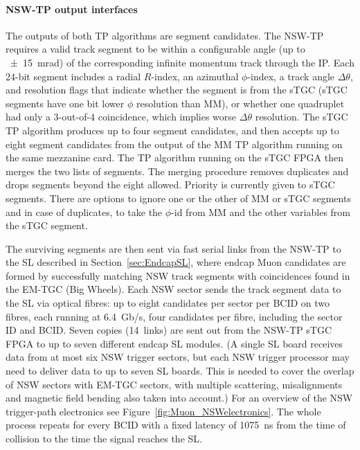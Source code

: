 \documentclass[cernpreprint, atlasdraft=false, UKenglish,british,orcidlogo, texmf, orcidlogo]{atlasdoc}
\begin{document}
\paragraph{NSW-TP output interfaces}
The outputs of both \gls{TP} algorithms are segment candidates.
The \gls{NSW-TP} requires a valid track segment to be within a configurable angle (up to \SI{\pm 15}{\milli\radian}) of the corresponding infinite momentum track through the \gls{IP}.
Each 24-bit segment includes a radial $R$-index, an azimuthal $\phi$-index, a track angle $\Delta\theta$, and resolution flags that indicate whether the segment is from the \gls{sTGC} (\gls{sTGC} segments have one bit lower $\phi$ resolution than \gls{MM}), or whether one quadruplet had only a 3-out-of-4 coincidence, which implies worse $\Delta\theta$ resolution.
The \gls{sTGC} \gls{TP} algorithm produces up to four segment candidates, and then accepts up to eight segment candidates from the output of the \gls{MM} \gls{TP} algorithm running on the same mezzanine card.
The \gls{TP} algorithm running on the \gls{sTGC} \gls{FPGA} then merges the two lists of segments.
The merging procedure removes duplicates and drops segments beyond the eight allowed.
Priority is currently given to \gls{sTGC} segments. There are options to ignore one or the other of \gls{MM} or \gls{sTGC} segments and in case of duplicates, to take the $\phi$-id from \gls{MM} and the other variables from the \gls{sTGC} segment.~\cite{NSWelx}
 
The surviving segments are then sent via fast serial links from the \gls{NSW-TP} to the \gls{SL} described in Section~\ref{sec:EndcapSL}, where endcap Muon candidates are formed by successfully matching \gls{NSW} track segments with coincidences found in the \gls{EM-TGC} (Big Wheels).
Each \gls{NSW} sector sends the track segment data to the \gls{SL} via optical fibres: up to eight candidates per sector per \gls{BCID} on two fibres, each running at \SI{6.4}{Gb/\s}, four candidates per fibre,
including the sector ID and \gls{BCID}.
Seven copies (14~links) are sent out from the \gls{NSW-TP}  \gls{sTGC} \gls{FPGA}
to up to seven different endcap \gls{SL} modules.
(A single \gls{SL} board receives data from at most six \gls{NSW} trigger sectors, but each \gls{NSW} trigger processor may need to deliver data to up to seven \gls{SL} boards.
This is needed to cover the overlap of \gls{NSW} sectors with \gls{EM-TGC} sectors, with multiple scattering, misalignments and magnetic field bending also taken into account.)
For an overview of the \gls{NSW} trigger-path electronics see Figure~\ref{fig:Muon_NSWelectronics}.
The whole process repeats for every \gls{BCID} with a fixed latency of \SI{1075}{\ns} 
from the time of collision to the time the signal reaches the \gls{SL}.
 
\end{document}
